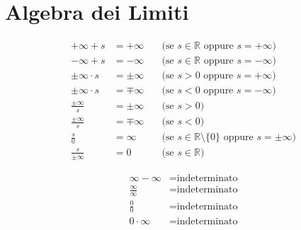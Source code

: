 \documentclass{book}
\begin{document}
\section{Algebra dei Limiti}
\begin{proposition}
    \begin{align*}
        +\infty + s                      & = +\infty \quad   & \text{(se } s \in \mathbb{R} \text{ oppure } s = +\infty\text{)}                   \\
        -\infty + s                      & = -\infty \quad   & \text{(se } s \in \mathbb{R} \text{ oppure } s = -\infty\text{)}                   \\
        \pm\infty \cdot s                & = \pm\infty \quad & \text{(se } s > 0 \text{ oppure } s = +\infty\text{)}                              \\
        \pm\infty \cdot s                & = \mp\infty \quad & \text{(se } s < 0 \text{ oppure } s = -\infty\text{)}                              \\
        \displaystyle\frac{\pm\infty}{s} & = \pm\infty \quad & \text{(se } s > 0\text{)}                                                          \\
        \displaystyle\frac{\pm\infty}{s} & = \mp\infty \quad & \text{(se } s < 0\text{)}                                                          \\
        \displaystyle\frac{s}{0}         & = \infty \quad    & \text{(se } s \in \mathbb{R} \setminus \{0\} \text{ oppure } s = \pm\infty\text{)} \\
        \displaystyle\frac{s}{\pm\infty} & = 0 \quad         & \text{(se } s \in \mathbb{R}\text{)}
    \end{align*}
\end{proposition}
\begin{proposition}
    \begin{align*}
        \infty - \infty       & = \text{indeterminato} \\
        \frac{\infty}{\infty} & = \text{indeterminato} \\
        \frac{0}{0}           & = \text{indeterminato} \\
        0 \cdot \infty        & = \text{indeterminato}
    \end{align*}
\end{proposition}
\end{document}
